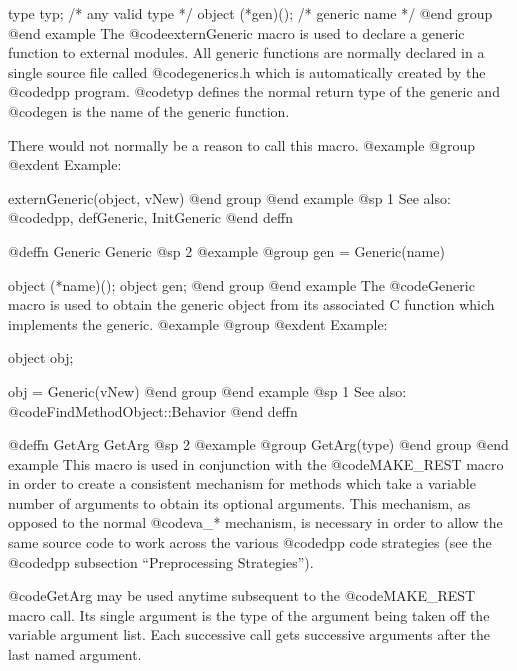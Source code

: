 {{{{type    typ;       /*  any valid type  */
object  (*gen)();  /*  generic name    */
@end group
@end example
The @code{externGeneric} macro is used to declare a generic function to
external modules.  All generic functions are normally declared in a
single source file called @code{generics.h} which is automatically
created by the @code{dpp} program.  @code{typ} defines the normal
return type of the generic and @code{gen} is the name of the generic
function.

There would not normally be a reason to call this macro.
@example
@group
@exdent Example:

externGeneric(object, vNew)
@end group
@end example
@sp 1
See also:  @code{dpp, defGeneric, InitGeneric}
@end deffn










@deffn {Generic} Generic
@sp 2
@example
@group
gen = Generic(name)

object  (*name)();
object  gen;
@end group
@end example
The @code{Generic} macro is used to obtain the generic object from its
associated C function which implements the generic.
@example
@group
@exdent Example:

object  obj;

obj = Generic(vNew)
@end group
@end example
@sp 1
See also:  @code{FindMethodObject::Behavior}
@end deffn














@deffn {GetArg} GetArg
@sp 2
@example
@group
GetArg(type)
@end group
@end example
This macro is used in conjunction with the @code{MAKE_REST} macro in order
to create a consistent mechanism for methods which take a variable
number of arguments to obtain its optional arguments.  This mechanism,
as opposed to the normal @code{va_*} mechanism, is necessary in order to
allow the same source code to work across the various @code{dpp} code
strategies (see the @code{dpp} subsection ``Preprocessing Strategies'').

@code{GetArg} may be used anytime subsequent to the @code{MAKE_REST}
macro call.  Its single argument is the type of the argument being
taken off the variable argument list.  Each successive call gets
successive arguments after the last named argument.

}}}}
